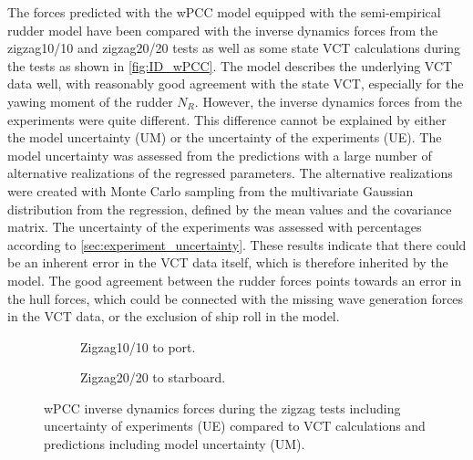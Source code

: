 \noindent The forces predicted with the wPCC model equipped with the semi-empirical rudder model have been compared with the inverse dynamics forces from the zigzag10/10 and zigzag20/20 tests as well as some state VCT calculations during the tests as shown in \autoref{fig:ID_wPCC}. 
The model describes the underlying VCT data well, with reasonably good agreement with the state VCT, especially for the yawing moment of the rudder $N_R$. However, the inverse dynamics forces from the experiments were quite different. 
This difference cannot be explained by either the model uncertainty (UM) or the uncertainty of the experiments (UE). The model uncertainty was assessed from the predictions with a large number of alternative realizations of the regressed parameters. The alternative realizations were created with Monte Carlo sampling from the multivariate Gaussian distribution from the regression, defined by the mean values and the covariance matrix. The uncertainty of the experiments was assessed with percentages according to \autoref{sec:experiment_uncertainty}.   
These results indicate that there could be an inherent error in the VCT data itself, which is therefore inherited by the model. The good agreement between the rudder forces points towards an error in the hull forces, which could be connected with the missing wave generation forces in the VCT data, or the exclusion of ship roll in the model.
\begin{figure}[h]
     \centering
     \begin{subfigure}[b]{\textwidth}
         \centering
         
        \caption{Zigzag10/10 to port.}
        \label{fig:ID_wPCC_10}
     \end{subfigure}
     \vfill
     \begin{subfigure}[b]{\textwidth}
        \centering
        
        \caption{Zigzag20/20 to starboard.}
        \label{fig:ID_wPCC}
     \end{subfigure}
        \caption{wPCC inverse dynamics forces during the zigzag tests including uncertainty of experiments (UE) compared to VCT calculations and predictions including model uncertainty (UM).}
        \label{fig:ID_wPCC}
\end{figure}